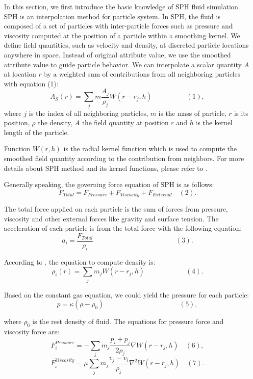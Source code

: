 In this section, we first introduce the basic knowledge of SPH fluid
simulation. SPH is an interpolation method for particle system. In
SPH, the fluid is composed of a set of particles with inter-particle
forces such as pressure and viscosity computed at the position of a
particle within a smoothing kernel. We define field quantities, such
as velocity and density, at discreted particle locations anywhere in
space. Instead of original attribute value, we use the smoothed
attribute value to guide particle behavior. We can interpolate a
scalar quantity $A$ at location $r$ by a weighted sum of contributions
from all neighboring particles with equation (1):
$$A_{S}(r)=\sum_{j}m\frac{A_j}{\rho_j}W(r-r_j, h) \quad \quad \quad
\quad \quad (1),$$
\noindent where $j$ is the index of all neighboring particles, $m$ is the mass of particle,
$r$ is its position, $\rho$ the density, $A$ the field quantity at position $r$ and $h$ is the kernel length of the particle.

Function $W(r,h)$ is the radial kernel function which is used to
compute the smoothed field quantity according to the contribution from
neighbors. For more details about SPH method and its kernel functions,
please refer to \cite{Muller:2003:PFS:846276.846298}.

Generally speaking, the governing force equation of SPH is as follows:
$$F_{Total}=F_{Pressure}+F_{Viscosity}+F_{External} \quad (2).$$

The total force applied on each particle is the sum of forces from
pressure, viscosity and other external forces like gravity and surface
tension. The acceleration of each particle is from the total force
with the following equation: $$a_i=\frac{F_{Total}}{\rho_i} \quad
\quad \quad \quad \quad \quad \quad \quad \quad \quad \quad
\quad(3).$$

According to \cite{Muller:2003:PFS:846276.846298}, the equation to
compute density is: $$\rho_i(r)=\sum_{j}m_jW(r-r_j, h) \quad \quad
\quad \quad \quad \quad(4).$$

Based on the constant gas equation, we could yield the pressure for
each particle: $$p=\kappa(\rho-\rho_0) \quad \quad \quad \quad \quad
\quad \quad \quad \quad \quad \quad(5),$$

\noindent where $\rho_0$ is the rest density of fluid.
The equations for pressure force and viscosity force are:
$$F^{Pressure}_i=-\sum_{j}m_j\frac{p_i+p_j}{2\rho_j}\nabla W(r-r_j, h) \quad (6),$$
$$F^{Viscosity}_i=\mu\sum_{j}m_j\frac{v_j-v_i}{\rho_j}\nabla^2W(r-r_j, h) \quad (7).$$

